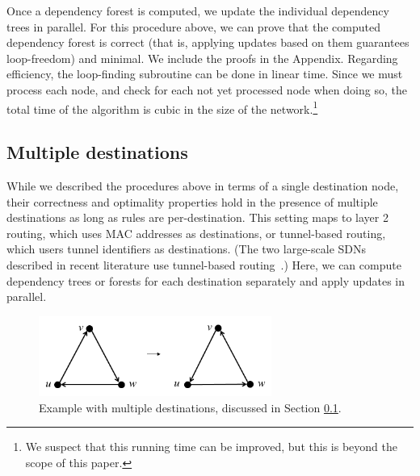 

Once a dependency forest is computed, we update the individual dependency trees in parallel. For this procedure above, we can prove that the computed dependency forest is correct (that is, applying updates based on them guarantees loop-freedom) and minimal. We include the proofs in the Appendix. Regarding efficiency, the loop-finding subroutine can be done in linear time. Since we must process each node, and check for each not yet processed node when doing so, the total time of the algorithm is cubic in the size of the network.\footnote{We suspect that this running time can be improved, but this is beyond the scope of this paper.}

\subsection{Multiple destinations}
\label{sec:multidest}

While we described the procedures above in terms of a single destination node, their correctness and optimality properties hold in the presence of multiple destinations as long as rules are per-destination. This setting maps to layer 2 routing, which uses MAC addresses as destinations, or tunnel-based routing, which users tunnel identifiers as destinations. (The two large-scale SDNs described in recent literature use tunnel-based routing~\cite{swan,b4}.) Here, we can compute dependency trees or forests for each destination separately and apply updates in parallel.

\begin{figure}[t!]
\includegraphics[width=3in]{figures/multidest.png}
\caption{Example with multiple destinations, discussed in Section \ref{sec:multidest}.}
\label{fig:multidest}
\end{figure}

